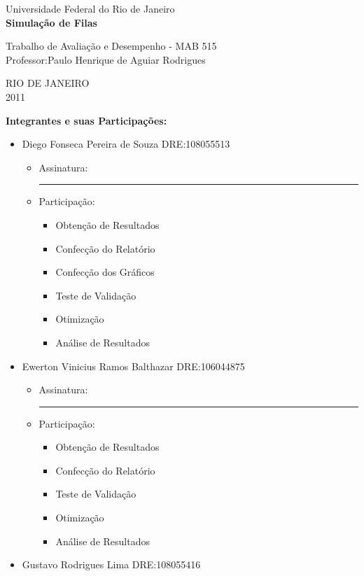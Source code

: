 \documentclass[a4paper,10pt]{article}
\begin{document}
\begin{titlepage}
\vfill
\begin{center}
{\Large Universidade Federal do Rio de Janeiro} \\[7cm]
{\Large \textbf{Simulação de Filas}}\\[5cm]
\begin{large}{Trabalho de Avaliação e Desempenho - MAB 515 \\ Professor:Paulo Henrique de Aguiar Rodrigues}\end{large}
\vfill
{RIO DE JANEIRO\\2011}
\end{center}
\end{titlepage}

\begin{titlepage}
\textbf{Integrantes e suas Participações:}
\begin{itemize}
 \item Diego Fonseca Pereira de Souza   DRE:108055513
 \begin{itemize}
    \item Assinatura: \rule{6cm}{.1mm}	
    \item Participação:
    \begin{itemize}
	\item Obtenção de Resultados
	\item Confecção do Relatório
	\item Confecção dos Gráficos
	\item Teste de Validação
	\item Otimização
	\item Análise de Resultados
    \end{itemize}
 \end{itemize}
 \item Ewerton Vinicius Ramos Balthazar DRE:106044875
  \begin{itemize}
    \item Assinatura: \rule{6cm}{.1mm}	
    \item Participação:
    \begin{itemize}
	\item Obtenção de Resultados
	\item Confecção do Relatório
	\item Teste de Validação
	\item Otimização
	\item Análise de Resultados
    \end{itemize}
 \end{itemize}
 \item Gustavo Rodrigues Lima           DRE:108055416

\end{itemize}
\end{titlepage}
\end{document}
